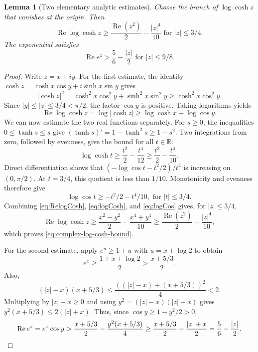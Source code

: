 \documentclass[10pt,twoside]{article}
\theoremstyle{plain}
\newtheorem{lemma}[theorem]{Lemma}
\theoremstyle{definition}
\theoremstyle{remark}
\begin{document}
\begin{lemma}[Two elementary analytic estimates]
\label{lem:elementary-complex}
Choose the branch of $\log\cosh z$ that vanishes at the origin.
Then
\begin{equation}
\label{eq:complex-log-cosh-bound}
\operatorname{Re}\log\cosh z\geq
\frac{\operatorname{Re}(z^2)}2-\frac{|z|^4}{10}
 \text{ for } |z|\leq3/4.
\end{equation}
The exponential satisfies
\begin{equation}
\label{eq:linear-exponential-bound}
\operatorname{Re}e^z >\frac56-\frac{|z|}{2}
\text{ for }|z|\leq9/8.
\end{equation}
\end{lemma}
\begin{proof}
Write $z=x+iy$. For the first estimate, the identity
$
\cosh z=\cosh x\cos y+i\sinh x\sin y
$
gives
$$
|\cosh z|^2
=\cosh^2x\cos^2y+\sinh^2x\sin^2y
\geq\cosh^2x\cos^2y.
$$
Since $|y|\le |z| \le 3/4<\pi/2$, the factor $\cos y$ is positive.
Taking logarithms yields
\begin{equation}\label{eq:RelogCosh}
\operatorname{Re}\log\cosh z=\log|\cosh z|
\geq\log\cosh x+\log\cos y.  
\end{equation}
We can now estimate the two real functions separately.
For $s\geq0$, the inequalities $0\leq\tanh s\leq s$ give
$(\tanh s)'=1-\tanh^2s\geq1-s^2$.
Two integrations from zero, followed by evenness, give the bound
for all $t\in\mathbb R$:
\begin{equation}\label{eq:logCosh}
\log\cosh t\geq\frac{t^2}{2}-\frac{t^4}{12} \geq\frac{t^2}{2}-\frac{t^4}{10}.
\end{equation}
Direct differentiation shows that
$(-\log\cos t-t^2/2)/t^4$ is increasing on $(0,\pi/2)$.
At $t=3/4$, this quotient is less than $1/10$.
Monotonicity and evenness therefore give
\begin{equation}\label{eq:logCos}\log\cos t\geq-t^2/2-t^4/10, \text{ for }|t|\leq3/4.
\end{equation}
Combining \eqref{eq:RelogCosh}, \eqref{eq:logCosh}, and
\eqref{eq:logCos} gives, for $|z|\leq3/4$,
$$
\operatorname{Re}\log\cosh z
\geq\frac{x^2-y^2}{2}-\frac{x^4+y^4}{10}
\geq\frac{\operatorname{Re}(z^2)}2-\frac{|z|^4}{10},
$$
which proves \eqref{eq:complex-log-cosh-bound}.

For the second estimate, apply $e^u\geq1+u$ with $u=x+\log 2$ to obtain
$$
e^x\geq\frac{1+x+\log2}{2}> \frac{x+5/3}{2}.
$$
Also,
$$
(|z|-x)(x+5/3)
\leq\frac{((|z|-x)+(x+5/3))^2}{4}<2.
$$
Multiplying by $|z|+x\geq0$ and using
$y^2=(|z|-x)(|z|+x)$ gives
$y^2(x+5/3)\le 2(|z|+x)$.
Thus, since $\cos y\geq1-y^2/2>0$,
\begin{equation*}
\operatorname{Re}e^z
=e^x\cos y>\frac{x+5/3}{2}-\frac{y^2(x+5/3)}4 \ge \frac{x+5/3}{2}-\frac{|z|+x}{2}
=\frac56-\frac{|z|}{2}.
\qedhere
\end{equation*}
\end{proof}
\end{document}
